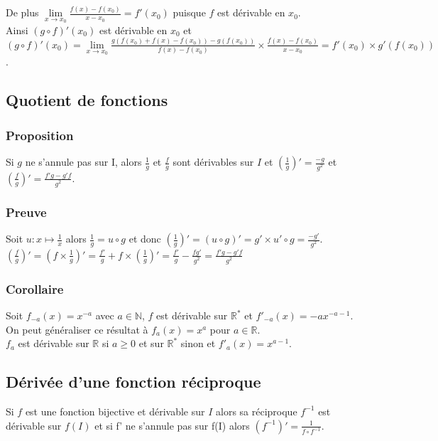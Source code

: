 \documentclass[a4paper,10pt]{book} %
\newcommand{\R}{\mathbb{R}}
\newcommand{\N}{\mathbb{N}}
\begin{document}
De plus $\lim\limits_{x\rightarrow x_0}\frac{f(x)-f(x_{0})}{x-x_{0}}=f'(x_0)$ puisque $f$ est dérivable en $x_0$.\\

Ainsi $(g\circ f)'(x_0)$ est dérivable en $x_0$ et\\
$(g\circ f)'(x_0)=\lim\limits_{x\rightarrow x_0}\frac{g(f(x_{0})+f(x)-f(x_{0}))-g(f(x_{0}))}{f(x)-f(x_0)} \times \frac{f(x)-f(x_{0})}{x-x_{0}}=f'(x_0)\times g'(f(x_0))$.

\subsection{Quotient de fonctions}
\subsubsection{Proposition}
Si $g$ ne s'annule pas sur I, alors $\frac{1}{g}$ et $\frac{f}{g}$ sont dérivables sur $I$ et $(\frac{1}{g})'=\frac{-g}{g^{2}}$ et $(\frac{f}{g})'=\frac{f'g-g'f}{g^{2}}$.

\subsubsection{Preuve}
Soit $u:x\mapsto \frac{1}{x}$ alors $\frac{1}{g}=u\circ g$ et donc $(\frac{1}{g})'=(u\circ g)'=g'\times u'\circ g=\frac{-g'}{g^{2}}$.\\

$(\frac{f}{g})'=(f\times \frac{1}{g})'=\frac{f'}{g}+f\times (\frac{1}{g})'=\frac{f'}{g}-\frac{fg'}{g^{2}}=\frac{f'g-g'f}{g^{2}}$\\

\subsubsection{Corollaire}
Soit $f_{-a}(x)=x^{-a}$ avec $a\in \N$, $f$ est dérivable sur $\R^{*}$ et $f'_{-a}(x)=-ax^{-a-1}$.\\

On peut généraliser ce résultat à $f_a(x)=x^{a}$ pour $a \in \R$.\\
$f_a$ est dérivable sur $\R$ si $a\geq 0$ et sur $\R^{*}$ sinon et $f'_a(x)=x^{a-1}$.\\

\subsection{Dérivée d'une fonction réciproque}
Si $f$ est une fonction bijective et dérivable sur $I$ alors sa réciproque $f^{-1}$ est dérivable sur $f(I)$ et si f' ne s'annule pas sur f(I) alors $(f^{-1})'=\frac{1}{f\circ f^{-1}}$.
\end{document}
